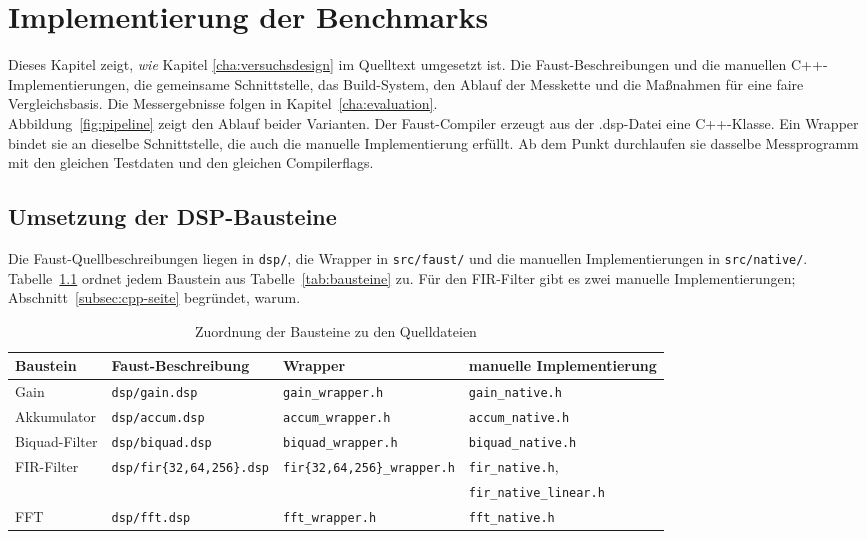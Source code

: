 \chapter{Implementierung der Benchmarks}
\label{cha:implementierung}

Dieses Kapitel zeigt, \emph{wie} Kapitel \ref{cha:versuchsdesign} im Quelltext umgesetzt ist. Die Faust-Beschreibungen und die manuellen C++-Implementierungen, die gemeinsame Schnittstelle, das Build-System, den Ablauf der Messkette und die Maßnahmen für eine faire Vergleichsbasis. Die Messergebnisse folgen in Kapitel~\ref{cha:evaluation}.\\

Abbildung~\ref{fig:pipeline} zeigt den Ablauf beider Varianten. Der Faust-Compiler erzeugt aus der .dsp-Datei eine C++-Klasse. Ein Wrapper bindet sie an dieselbe Schnittstelle, die auch die manuelle Implementierung erfüllt. Ab dem Punkt durchlaufen sie dasselbe Messprogramm mit den gleichen Testdaten und den gleichen Compilerflags.\\
 


\section{Umsetzung der DSP-Bausteine}
\label{sec:umsetzung}

Die Faust-Quellbeschreibungen liegen in \texttt{dsp/}, die Wrapper in \texttt{src/faust/} und die manuellen Implementierungen in \texttt{src/native/}. Tabelle~\ref{tab:dateien} ordnet jedem Baustein aus Tabelle~\ref{tab:bausteine} zu. Für den FIR-Filter gibt es zwei manuelle Implementierungen; Abschnitt~\ref{subsec:cpp-seite} begründet, warum.

\begin{table}[htb]
	\centering
	\small
	\caption{Zuordnung der Bausteine zu den Quelldateien}
	\label{tab:dateien}
	\begin{tabular}{llll}
		\toprule
		Baustein       & Faust-Beschreibung   & Wrapper & manuelle Implementierung \\
		\midrule
		Gain           & \texttt{dsp/gain.dsp}   & \texttt{gain\_wrapper.h}   & \texttt{gain\_native.h}   \\
		Akkumulator    & \texttt{dsp/accum.dsp}  & \texttt{accum\_wrapper.h}  & \texttt{accum\_native.h}  \\
		Biquad-Filter  & \texttt{dsp/biquad.dsp} & \texttt{biquad\_wrapper.h} & \texttt{biquad\_native.h} \\
		FIR-Filter     & \texttt{dsp/fir\{32,64,256\}.dsp}
		& \texttt{fir\{32,64,256\}\_wrapper.h}
		& \texttt{fir\_native.h}, \\
		&&& \texttt{fir\_native\_linear.h} \\
		FFT            & \texttt{dsp/fft.dsp}    & \texttt{fft\_wrapper.h}    & \texttt{fft\_native.h}    \\
		\bottomrule
	\end{tabular}
\end{table}

